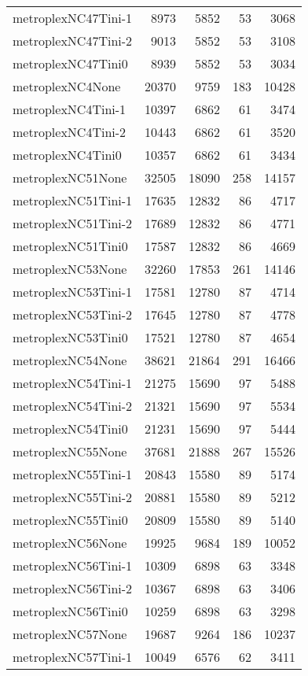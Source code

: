 \begin{longtable}{lrrrr}
metroplexNC47Tini-1 & 8973 & 5852 & 53 & 3068 \\
metroplexNC47Tini-2 & 9013 & 5852 & 53 & 3108 \\
metroplexNC47Tini0 & 8939 & 5852 & 53 & 3034 \\
metroplexNC4None & 20370 & 9759 & 183 & 10428 \\
metroplexNC4Tini-1 & 10397 & 6862 & 61 & 3474 \\
metroplexNC4Tini-2 & 10443 & 6862 & 61 & 3520 \\
metroplexNC4Tini0 & 10357 & 6862 & 61 & 3434 \\
metroplexNC51None & 32505 & 18090 & 258 & 14157 \\
metroplexNC51Tini-1 & 17635 & 12832 & 86 & 4717 \\
metroplexNC51Tini-2 & 17689 & 12832 & 86 & 4771 \\
metroplexNC51Tini0 & 17587 & 12832 & 86 & 4669 \\
metroplexNC53None & 32260 & 17853 & 261 & 14146 \\
metroplexNC53Tini-1 & 17581 & 12780 & 87 & 4714 \\
metroplexNC53Tini-2 & 17645 & 12780 & 87 & 4778 \\
metroplexNC53Tini0 & 17521 & 12780 & 87 & 4654 \\
metroplexNC54None & 38621 & 21864 & 291 & 16466 \\
metroplexNC54Tini-1 & 21275 & 15690 & 97 & 5488 \\
metroplexNC54Tini-2 & 21321 & 15690 & 97 & 5534 \\
metroplexNC54Tini0 & 21231 & 15690 & 97 & 5444 \\
metroplexNC55None & 37681 & 21888 & 267 & 15526 \\
metroplexNC55Tini-1 & 20843 & 15580 & 89 & 5174 \\
metroplexNC55Tini-2 & 20881 & 15580 & 89 & 5212 \\
metroplexNC55Tini0 & 20809 & 15580 & 89 & 5140 \\
metroplexNC56None & 19925 & 9684 & 189 & 10052 \\
metroplexNC56Tini-1 & 10309 & 6898 & 63 & 3348 \\
metroplexNC56Tini-2 & 10367 & 6898 & 63 & 3406 \\
metroplexNC56Tini0 & 10259 & 6898 & 63 & 3298 \\
metroplexNC57None & 19687 & 9264 & 186 & 10237 \\
metroplexNC57Tini-1 & 10049 & 6576 & 62 & 3411 \\

\end{longtable}
